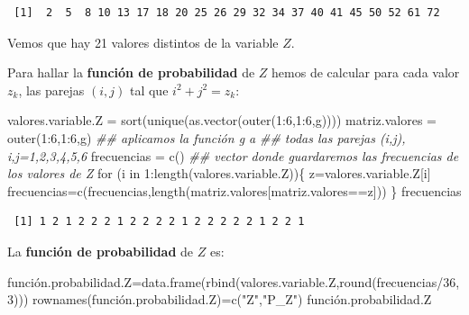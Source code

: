 \documentclass[
  letterpaper,
  DIV=11,
  numbers=noendperiod]{scrreprt}
\newenvironment{Shaded}{\begin{snugshade}}{\end{snugshade}}
\newcommand{\ControlFlowTok}[1]{\textcolor[rgb]{0.00,0.23,0.31}{#1}}
\newcommand{\DecValTok}[1]{\textcolor[rgb]{0.68,0.00,0.00}{#1}}
\newcommand{\DocumentationTok}[1]{\textcolor[rgb]{0.37,0.37,0.37}{\textit{#1}}}
\newcommand{\FunctionTok}[1]{\textcolor[rgb]{0.28,0.35,0.67}{#1}}
\newcommand{\NormalTok}[1]{\textcolor[rgb]{0.00,0.23,0.31}{#1}}
\newcommand{\OtherTok}[1]{\textcolor[rgb]{0.00,0.23,0.31}{#1}}
\newcommand{\SpecialCharTok}[1]{\textcolor[rgb]{0.37,0.37,0.37}{#1}}
\newcommand{\StringTok}[1]{\textcolor[rgb]{0.13,0.47,0.30}{#1}}
\begin{document}
\begin{verbatim}
 [1]  2  5  8 10 13 17 18 20 25 26 29 32 34 37 40 41 45 50 52 61 72
\end{verbatim}

Vemos que hay 21 valores distintos de la variable \(Z\).

Para hallar la \textbf{función de probabilidad} de \(Z\) hemos de
calcular para cada valor \(z_k\), las parejas \((i,j)\) tal que
\(i^2+j^2=z_k\):

\begin{Shaded}
\begin{Highlighting}[]
\NormalTok{valores.variable.Z }\OtherTok{=} \FunctionTok{sort}\NormalTok{(}\FunctionTok{unique}\NormalTok{(}\FunctionTok{as.vector}\NormalTok{(}\FunctionTok{outer}\NormalTok{(}\DecValTok{1}\SpecialCharTok{:}\DecValTok{6}\NormalTok{,}\DecValTok{1}\SpecialCharTok{:}\DecValTok{6}\NormalTok{,g))))  }
\NormalTok{matriz.valores }\OtherTok{=} \FunctionTok{outer}\NormalTok{(}\DecValTok{1}\SpecialCharTok{:}\DecValTok{6}\NormalTok{,}\DecValTok{1}\SpecialCharTok{:}\DecValTok{6}\NormalTok{,g) }\DocumentationTok{\#\# aplicamos la función g a }
\DocumentationTok{\#\#  todas las parejas (i,j), i,j=1,2,3,4,5,6}
\NormalTok{frecuencias }\OtherTok{=} \FunctionTok{c}\NormalTok{()  }\DocumentationTok{\#\# vector donde guardaremos las frecuencias de los valores de Z}
\ControlFlowTok{for}\NormalTok{ (i }\ControlFlowTok{in} \DecValTok{1}\SpecialCharTok{:}\FunctionTok{length}\NormalTok{(valores.variable.Z))\{}
\NormalTok{  z}\OtherTok{=}\NormalTok{valores.variable.Z[i]}
\NormalTok{  frecuencias}\OtherTok{=}\FunctionTok{c}\NormalTok{(frecuencias,}\FunctionTok{length}\NormalTok{(matriz.valores[matriz.valores}\SpecialCharTok{==}\NormalTok{z]))}
\NormalTok{\}}
\NormalTok{frecuencias}
\end{Highlighting}
\end{Shaded}

\begin{verbatim}
 [1] 1 2 1 2 2 2 1 2 2 2 2 1 2 2 2 2 2 1 2 2 1
\end{verbatim}

La \textbf{función de probabilidad} de \(Z\) es:

\begin{Shaded}
\begin{Highlighting}[]
\NormalTok{función.probabilidad.Z}\OtherTok{=}\FunctionTok{data.frame}\NormalTok{(}\FunctionTok{rbind}\NormalTok{(valores.variable.Z,}\FunctionTok{round}\NormalTok{(frecuencias}\SpecialCharTok{/}\DecValTok{36}\NormalTok{,}\DecValTok{3}\NormalTok{)))}
\FunctionTok{rownames}\NormalTok{(función.probabilidad.Z)}\OtherTok{=}\FunctionTok{c}\NormalTok{(}\StringTok{"Z"}\NormalTok{,}\StringTok{"P\_Z"}\NormalTok{)}
\NormalTok{función.probabilidad.Z}
\end{Highlighting}
\end{Shaded}
\end{document}
